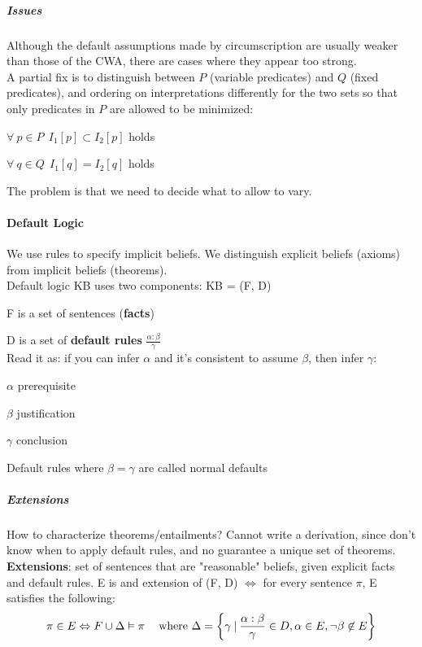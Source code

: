 \documentclass[10pt]{report}
\begin{document}
\subparagraph{Issues} Although the default assumptions made by circumscription are usually weaker than those of the CWA, there are cases where they appear too strong.\\
A partial fix is to distinguish between $P$ (variable predicates) and $Q$ (fixed predicates), and ordering on interpretations differently for the two sets so that only predicates in $P$ are allowed to be minimized:
\begin{list}{}{}
	\item $\forall\:p\in P\:\:I_1[p] \subset I_2[p]$ holds
	\item $\forall\:q\in Q\:\:I_1[q] = I_2[q]$ holds
\end{list}
The problem is that we need to decide what to allow to vary.
\paragraph{Default Logic} We use rules to specify implicit beliefs. We distinguish explicit beliefs (axioms) from implicit beliefs (theorems).\\
Default logic KB uses two components: KB = (F, D)
\begin{list}{}{}
	\item F is a set of sentences (\textbf{facts})
	\item D is a set of \textbf{default rules} $\frac{\alpha : \beta}{\gamma}$\\
	Read it as: if you can infer $\alpha$ and it's consistent to assume $\beta$, then infer $\gamma$:
	\begin{list}{}{}
		\item $\alpha$ prerequisite
		\item $\beta$ justification
		\item $\gamma$ conclusion
	\end{list}
	Default rules where $\beta = \gamma$ are called normal defaults
\end{list}
\subparagraph{Extensions} How to characterize theorems/entailments? Cannot write a derivation, since don't know when to apply default rules, and no guarantee a unique set of theorems.\\
\textbf{Extensions}: set of sentences that are "reasonable" beliefs, given explicit facts and default rules. E is and extension of (F, D) $\Leftrightarrow$ for every sentence $\pi$, E satisfies the following:
$$\pi\in E\Leftrightarrow F\cup\Delta \vDash \pi\:\:\:\: \hbox{ where }\Delta=\left\{\gamma\:|\:\frac{\alpha : \beta}{\gamma}\in D, \alpha\in E, \neg\beta\not\in E\right\}$$
\end{document}
